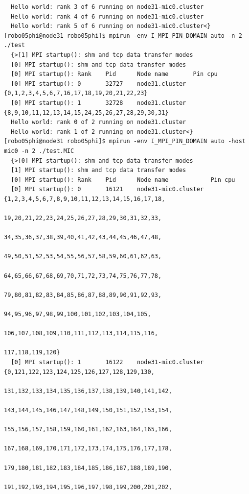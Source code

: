 \documentclass[pscyr,10pt]{hedlab}
\begin{document}
\begin{lstlisting}
  Hello world: rank 3 of 6 running on node31-mic0.cluster
  Hello world: rank 4 of 6 running on node31-mic0.cluster
  Hello world: rank 5 of 6 running on node31-mic0.cluster<}
[robo05phi@node31 robo05phi]$ mpirun -env I_MPI_PIN_DOMAIN auto -n 2 ./test
  {>[1] MPI startup(): shm and tcp data transfer modes
  [0] MPI startup(): shm and tcp data transfer modes
  [0] MPI startup(): Rank    Pid      Node name       Pin cpu
  [0] MPI startup(): 0       32727    node31.cluster  {0,1,2,3,4,5,6,7,16,17,18,19,20,21,22,23}
  [0] MPI startup(): 1       32728    node31.cluster  {8,9,10,11,12,13,14,15,24,25,26,27,28,29,30,31}
  Hello world: rank 0 of 2 running on node31.cluster
  Hello world: rank 1 of 2 running on node31.cluster<}
[robo05phi@node31 robo05phi]$ mpirun -env I_MPI_PIN_DOMAIN auto -host mic0 -n 2 ./test.MIC
  {>[0] MPI startup(): shm and tcp data transfer modes
  [1] MPI startup(): shm and tcp data transfer modes
  [0] MPI startup(): Rank    Pid      Node name            Pin cpu
  [0] MPI startup(): 0       16121    node31-mic0.cluster  {1,2,3,4,5,6,7,8,9,10,11,12,13,14,15,16,17,18,
                                                         19,20,21,22,23,24,25,26,27,28,29,30,31,32,33,
                                                         34,35,36,37,38,39,40,41,42,43,44,45,46,47,48,
                                                         49,50,51,52,53,54,55,56,57,58,59,60,61,62,63,
                                                         64,65,66,67,68,69,70,71,72,73,74,75,76,77,78,
                                                         79,80,81,82,83,84,85,86,87,88,89,90,91,92,93,
                                                         94,95,96,97,98,99,100,101,102,103,104,105,
                                                         106,107,108,109,110,111,112,113,114,115,116,
                                                         117,118,119,120}
  [0] MPI startup(): 1       16122    node31-mic0.cluster  {0,121,122,123,124,125,126,127,128,129,130,
                                                         131,132,133,134,135,136,137,138,139,140,141,142,
                                                         143,144,145,146,147,148,149,150,151,152,153,154,
                                                         155,156,157,158,159,160,161,162,163,164,165,166,
                                                         167,168,169,170,171,172,173,174,175,176,177,178,
                                                         179,180,181,182,183,184,185,186,187,188,189,190,
                                                         191,192,193,194,195,196,197,198,199,200,201,202,

\end{lstlisting}
\end{document}
